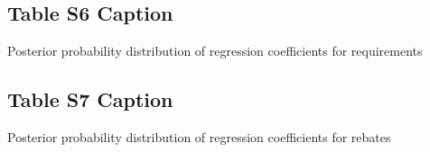 \documentclass[draft]{agujournal}
\begin{document}
\subsection*{Table S6 Caption}
\setcounter{table}{5}%
\begin{table}[H]
\centering
\caption{Posterior probability distribution of regression coefficients for requirements}
\end{table}


\subsection*{Table S7 Caption}
\setcounter{table}{6}%
\begin{table}[H]
\centering
\caption{Posterior probability distribution of regression coefficients for rebates}
\end{table}

%
\fi
%
%
% 
\end{document}
